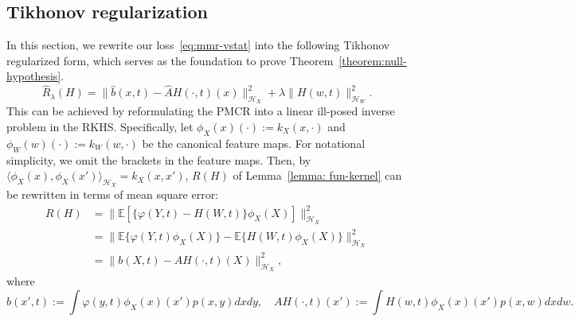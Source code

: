 \documentclass[
  12pt]{article}
\def\cH{\mathcal{H}}
\begin{document}
\subsection{Tikhonov regularization}
\label{appx.operator}
In this section, we rewrite our loss~\eqref{eq:mmr-vstat} into the following Tikhonov regularized form, which serves as the foundation to prove Theorem~\ref{theorem:null-hypothesis}. 
\begin{equation}\label{eq:mmr-obj-emp}
    \widehat{R}_{\lambda}(H) = \| \widehat{b}(x,t)-\widehat{A}H(\cdot,t)(x)\|_{\mathcal{H}_X}^{2}+\lambda\| H(w,t)\|_{\mathcal{H}_W}^{2}.
\end{equation}
This can be achieved by reformulating the PMCR into a linear ill-posed inverse problem in the RKHS. Specifically, let $\phi_X(x)(\cdot) := k_X(x,\cdot)$ and $\phi_W(w)(\cdot) := k_W(w,\cdot)$ be the canonical feature maps. For notational simplicity, we omit the brackets in the feature maps. Then, by $\langle \phi_X(x),\phi_X(x')\rangle_{\cH_X}=k_X(x,x')$, $R(H)$ of Lemma~\ref{lemma: fun-kernel} can be rewritten in terms of mean square error:
$$
\begin{aligned}
	R(H) &=\| \mathbb{E} [\{ \varphi (Y,t) -H(W,t)\} \phi_X(X) ] \|_{\mathcal{H}_X}^{2}\\
	&=\| \mathbb{E} \{\varphi (Y,t) \phi_X(X) \}-\mathbb{E} \{H(W,t) \phi_X(X)\} \|_{\mathcal{H}_X}^{2}\\
	&=\| b(X,t)-AH(\cdot,t)(X)\|_{\mathcal{H}_X}^{2},
\end{aligned}
$$
where
\begin{equation}\label{eq.operator_defination}
    b(x',t):=\int{\varphi (y,t) \phi_X(x)(x') p(x,y) dxdy},\quad AH(\cdot,t)(x'):=\int{H(w,t) \phi_X(x)(x') p(x,w) dxdw}.
\end{equation}
\end{document}
